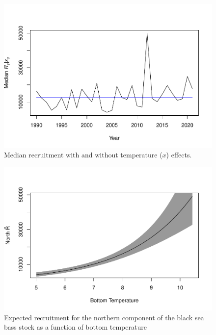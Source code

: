 \documentclass[
]{article}
\begin{document}
\begin{figure}

{\centering \includegraphics{bsb_models_wp_files/figure-latex/relative-recruitment-bt-1} 

}

\caption{Median recruitment with and without temperature ($x$) effects.}\label{fig:relative-recruitment-bt}
\end{figure}

\begin{figure}

{\centering \includegraphics{bsb_models_wp_files/figure-latex/rec-bottom-temp-1} 

}

\caption{Expected recruitment for the northern component of the black sea bass stock as a function of bottom temperature}\label{fig:rec-bottom-temp}
\end{figure}
\end{document}
